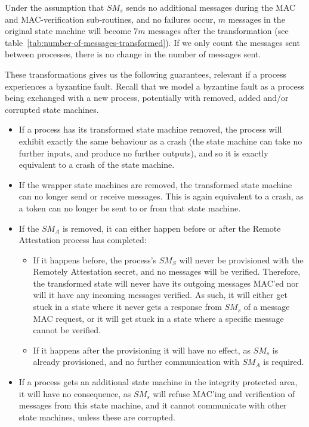 \documentclass{article}
\begin{document}
	Under the assumption that $SM_s$ sends no additional messages during the MAC and MAC-verification sub-routines, and no failures occur, $m$ messages in the original state machine will become $7m$ messages after the transformation (see table~\ref{tab:number-of-messages-transformed}).
	If we only count the messages sent between processes, there is no change in the number of messages sent.

	These transformations gives us the following guarantees, relevant if a process experiences a byzantine fault.
	Recall that we model a byzantine fault as a process being exchanged with a new process, potentially with removed, added and/or corrupted state machines.
	\begin{itemize}
		\item If a process has its transformed state machine removed, the process will exhibit exactly the same behaviour as a crash (the state machine can take no further inputs, and produce no further outputs), and so it is exactly equivalent to a crash of the state machine.
		\item If the wrapper state machines are removed, the transformed state machine can no longer send or receive messages.
		This is again equivalent to a crash, as a token can no longer be sent to or from that state machine.
		\item If the $SM_A$ is removed, it can either happen before or after the Remote Attestation process has completed:
		\begin{itemize}
			\item If it happens before, the process's $SM_S$ will never be provisioned with the Remotely Attestation secret, and no messages will be verified.
			Therefore, the transformed state will never have its outgoing messages MAC'ed nor will it have any incoming messages verified.
			As such, it will either get stuck in a state where it never gets a response from $SM_s$ of a message MAC request, or it will get stuck in a state where a specific message cannot be verified.
			\item If it happens after the provisioning it will have no effect, as $SM_s$ is already provisioned, and no further communication with $SM_A$ is required.
		\end{itemize}
		\item If a process gets an additional state machine in the integrity protected area, it will have no consequence, as $SM_s$ will refuse MAC'ing and verification of messages from this state machine, and it cannot communicate with other state machines, unless these are corrupted.

\end{itemize}
\end{document}
